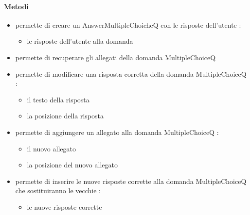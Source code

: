 \paragraph{Metodi}
\begin{itemize}
\item {}
\newline
permette di creare un AnswerMultipleChoicheQ con le risposte dell'utente
\newline
{} :
\begin{itemize}
\item {}
\newline
le risposte dell'utente alla domanda
\end{itemize}
\item {}
\newline
permette di recuperare gli allegati della domanda MultipleChoiceQ
\newline
\item {}
\newline
permette di modificare una risposta corretta della domanda MultipleChoiceQ
\newline
{} :
\begin{itemize}
\item {}
\newline
il testo della risposta
\item {}
\newline
la posizione della risposta
\end{itemize}
\item {}
\newline
permette di aggiungere un allegato alla domanda MultipleChoiceQ
\newline
{} :
\begin{itemize}
\item {}
\newline
il nuovo allegato
\item {}
\newline
la posizione del nuovo allegato
\end{itemize}
\item {}
\newline
permette di inserire le nuove risposte corrette alla domanda MultipleChoiceQ che sostituiranno le vecchie
\newline
{} :
\begin{itemize}
\item {}
\newline
le nuove risposte corrette
\end{itemize}
\end{itemize}
